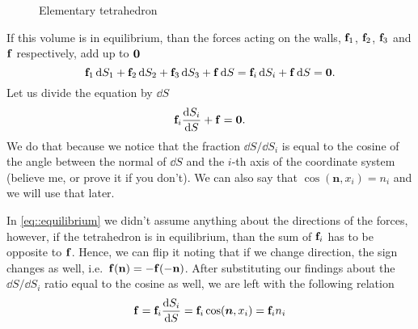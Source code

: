 \documentclass{article}
\begin{document}
\begin{figure}[bh!]
  \caption{Elementary tetrahedron}
  \label{fig::force_tetrahedron}
\end{figure}

If this volume is in equilibrium, than the forces acting on the walls, 
\(\vb{f}_1\), \(\vb{f}_2\), \(\vb{f}_3\) and \(\vb{f}\) respectively,
add up to \(\vb{0}\)
\begin{equation}\label{eq::equilibrium}
  \vb{f}_1 \dd{S_1} 
  + \vb{f}_2 \dd{S_2} 
  + \vb{f}_3 \dd{S_3} 
  + \vb{f} \dd{S} = \vb{f}_i \dd{S_i} + \vb{f} \dd{S} = \vb{0}.
\end{equation}
Let us divide the equation by \(\dd{S}\)
\[
  \vb{f}_i \dfrac{\dd{S_i}}{\dd{S}} + \vb{f} = \vb{0}.
\]
We do that because we notice that the fraction \(\dd{S} / \dd{S_i}\) is
equal to the cosine of the angle between the normal of \(\dd{S}\) and 
the \(i\)-th axis of the coordinate system (believe me, or prove it 
if you don't). We can also say that \(\cos(\bm{n}, x_i) = n_i\) and we will
use that later. 

In \autoref{eq::equilibrium} we didn't assume anything about the directions
of the forces, however, if the tetrahedron is in equilibrium, than the sum of 
\(\vb{f}_i\) has to be opposite to \(\vb{f}\). Hence, we can flip it noting
that if we change direction, the sign changes as well, i.e.\ 
\(\vb{f}(\vb{n}) = -\vb{f}(-\vb{n})\). 
After substituting our  findings about the 
\(\dd{S} / \dd{S_i}\) ratio equal to the cosine as well, we are left with the following relation
\[
  \vb{f} = \vb{f}_i \dfrac{\dd{S_i}}{\dd{S}} 
  = \vb{f}_i\cos(\bm{n}, x_i) 
  = \vb{f}_i n_i  
\]
\end{document}
